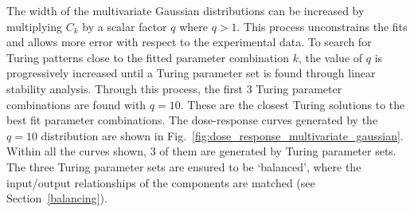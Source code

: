 The width of the multivariate Gaussian distributions can be increased by multiplying $C_k$ by a scalar factor $q$ where $q>1$.
This process unconstrains the fits and allows more error with respect to the experimental data.
To search for Turing patterns close to the fitted parameter combination $k$,
the value of $q$ is progressively increased until a Turing parameter set is found through linear stability analysis.
Through this process, the first 3 Turing parameter combinations are found with $q=10$.
These are the closest Turing solutions to the best fit parameter combinations.
The dose-response curves
generated by the $q=10$ distribution are shown in Fig.~\ref{fig:dose_response_multivariate_gaussian}.
Within all the curves shown, 3 of them are generated by Turing parameter sets.
The three Turing parameter sets are ensured to be ‘balanced’,
where the input/output relationships of the components are matched (see Section~\ref{balancing}).

